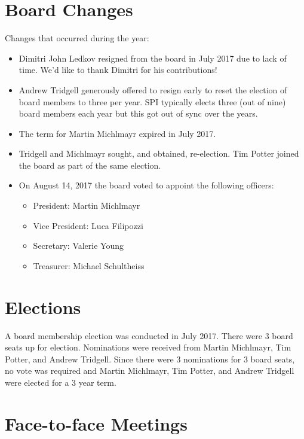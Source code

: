 \documentclass[a4paper]{report}
\begin{document}
\section{Board Changes}

Changes that occurred during the year:

\begin{itemize}

\item Dimitri John Ledkov resigned from the board in July 2017 due to lack
of time.  We'd like to thank Dimitri for his contributions!

\item Andrew Tridgell generously offered to resign early to reset the
election of board members to three per year. SPI typically elects three
(out of nine) board members each year but this got out of sync over the
years.

\item The term for Martin Michlmayr expired in July 2017.

\item Tridgell and Michlmayr sought, and obtained, re-election.  Tim
Potter joined the board as part of the same election.

\item On August 14, 2017 the board voted to appoint the following
officers:

\begin{itemize}
\item President: Martin Michlmayr
\item Vice President: Luca Filipozzi
\item Secretary: Valerie Young
\item Treasurer: Michael Schultheiss
\end{itemize}

\end{itemize}

\section{Elections}

A board membership election was conducted in July 2017.  There were 3 board
seats up for election.  Nominations were received from Martin Michlmayr,
Tim Potter, and Andrew Tridgell.  Since there were 3 nominations for 3
board seats, no vote was required and Martin Michlmayr, Tim Potter, and
Andrew Tridgell were elected for a 3 year term.

\section{Face-to-face Meetings}
\end{document}
